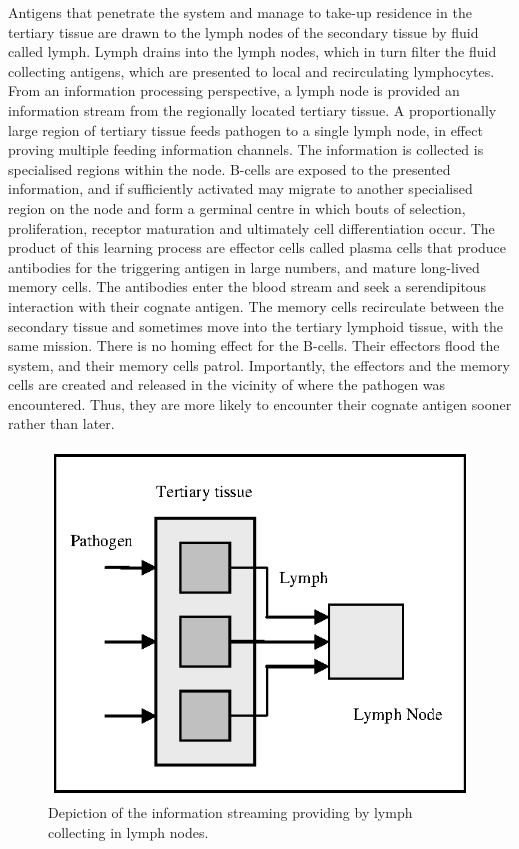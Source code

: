 Antigens that penetrate the system and manage to take-up residence in the tertiary tissue are drawn to the lymph nodes of the secondary tissue by fluid called lymph. Lymph drains into the lymph nodes, which in turn filter the fluid collecting antigens, which are presented to local and recirculating lymphocytes. From an information processing perspective, a lymph node is provided an information stream from the regionally located tertiary tissue. A proportionally large region of tertiary tissue feeds pathogen to a single lymph node, in effect proving multiple feeding information channels. The information is collected is specialised regions within the node. B-cells are exposed to the presented information, and if sufficiently activated may migrate to another specialised region on the node and form a germinal centre in which bouts of selection, proliferation, receptor maturation and ultimately cell differentiation occur. The product of this learning process are effector cells called plasma cells that produce antibodies for the triggering antigen in large numbers, and mature long-lived memory cells. The antibodies enter the blood stream and seek a serendipitous interaction with their cognate antigen. The memory cells recirculate between the secondary tissue and sometimes move into the tertiary lymphoid tissue, with the same mission. There is no homing effect for the B-cells. Their effectors flood the system, and their memory cells patrol. Importantly, the effectors and the memory cells are created and released in the vicinity of where the pathogen was encountered. Thus, they are more likely to encounter their cognate antigen sooner rather than later. 

\begin{figure}[ht]
	\centering
		\includegraphics[scale=0.75]{Tissues/tissues-models-streaming}
	\caption{Depiction of the information streaming providing by lymph collecting in lymph nodes.}
	\label{fig:tissues:architecture:streaming}
\end{figure}

